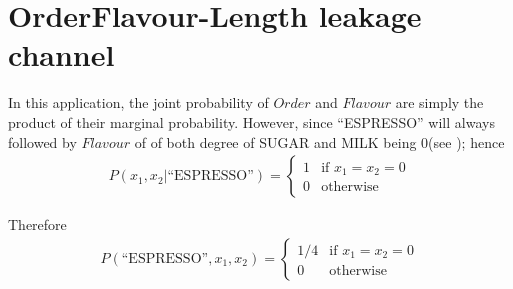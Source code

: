\chapter{OrderFlavour-Length leakage channel}
\label{OrderFlavour leakage channel}

In this application, the joint probability of $Order$ and $Flavour$ are simply the product of their marginal probability. However, since “ESPRESSO” will always followed by $Flavour$ of of both degree of SUGAR and MILK being $0$(see  ); hence
\begin{eqnarray*}
P(x_1, x_2 | \text{“ESPRESSO”}) = 
	\begin{cases}
	1 &\text{if } x_1 = x_2 = 0\\
	0 &\text{otherwise}
	\end{cases}
\end{eqnarray*}

Therefore
\begin{eqnarray*}
P(\text{“ESPRESSO”}, x_1, x_2 ) = 
	\begin{cases}
	1/4 &\text{if } x_1 = x_2 = 0\\
	0 &\text{otherwise}
	\end{cases}
\end{eqnarray*}